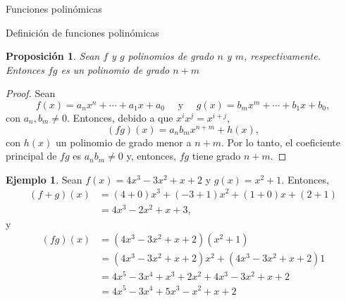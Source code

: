 \documentclass[a4paper,12pt,twoside,spanish,reqno]{amsbook}
\newtheorem{proposicion}[teorema]{Proposici\'on}
\theoremstyle{definition}
\newtheorem{ejemplo}{Ejemplo}[section]
\theoremstyle{remark}
\begin{document}
\begin{chapter}{Funciones polinómicas}
\begin{section}{Definición de funciones polinómicas}
    \begin{proposicion}
        Sean $f$ y $g$ polinomios de grado $n$ y $m$,  respectivamente. Entonces $fg$ es un  polinomio de grado $n+m$
    \end{proposicion}
    \begin{proof}
        Sean 
        \begin{equation*}
        f(x) = a_nx^n + \cdots + a_1x +a_0 \quad\text{ y } \quad g(x) = b_mx^m +\cdots + b_1x +b_0,
        \end{equation*}
        con $a_n, b_m \ne 0$. Entonces, debido a que $x^ix^j = x^{i+j}$, 
        \begin{equation}
            (fg)(x) = a_nb_m x^{n+m} + h(x),
         \end{equation}
        con $h(x)$ un polinomio de grado menor a $n+m$. Por lo tanto, el coeficiente principal de $fg$ es $a_nb_m \ne 0$ y,  entonces, $fg$ tiene grado $n+m$.
    \end{proof}

    
        
    \begin{ejemplo} Sean $f(x) = 4x^3 - 3x^2 + x + 2$ y $g(x) = x^2 + 1$. Entonces,
        \begin{align*}
            (f+g)(x) &= (4+0)x^3 +(-3 +1)x^2 + (1+0)x + (2+1)\\
            &= 4x^3 - 2x^2 + x + 3,
        \end{align*}
        y
        \begin{align*}
        (fg)(x) &= (4x^3 - 3x^2 + x + 2)(x^2 + 1)\\
        &= (4x^3 - 3x^2 + x + 2)x^2 + (4x^3 - 3x^2 + x + 2)1\\
        &= 4x^5 - 3x^4 + x^3 + 2x^2 + 4x^3 - 3x^2 + x + 2 \\
        &= 4x^5 - 3x^4 + 5x^3 - x^2 + x + 2
        \end{align*}
    \end{ejemplo}
    

    \end{section}

\end{chapter}
\end{document}

